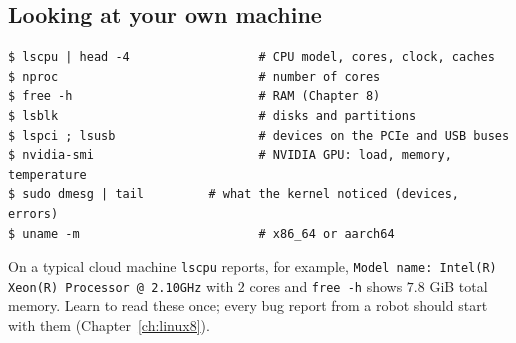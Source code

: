 \subsection*{Looking at your own machine}
\begin{verbatim}
$ lscpu | head -4                  # CPU model, cores, clock, caches
$ nproc                            # number of cores
$ free -h                          # RAM (Chapter 8)
$ lsblk                            # disks and partitions
$ lspci ; lsusb                    # devices on the PCIe and USB buses
$ nvidia-smi                       # NVIDIA GPU: load, memory, temperature
$ sudo dmesg | tail         # what the kernel noticed (devices, errors)
$ uname -m                         # x86_64 or aarch64
\end{verbatim}
On a typical cloud machine \texttt{lscpu} reports, for example, \texttt{Model name: Intel(R) Xeon(R) Processor @ 2.10GHz} with $2$ cores and \texttt{free -h} shows $7.8$ GiB total memory. Learn to read these once; every bug report from a robot should start with them (Chapter~\ref{ch:linux8}).

